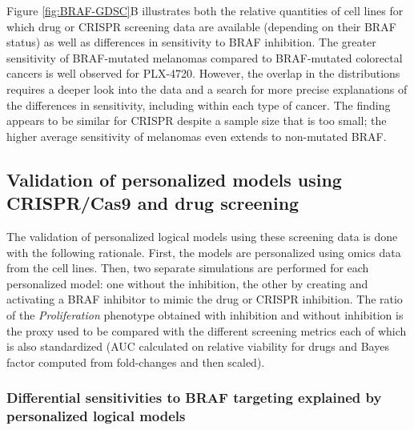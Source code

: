 \documentclass[a4paper,12pt,twoside,onecolumn,openright,final,oldfontcommands]{memoir}
\begin{document}
Figure \ref{fig:BRAF-GDSC}B illustrates both the relative quantities of
cell lines for which drug or CRISPR screening data are available
(depending on their BRAF status) as well as differences in sensitivity
to BRAF inhibition. The greater sensitivity of BRAF-mutated melanomas
compared to BRAF-mutated colorectal cancers is well observed for
PLX-4720. However, the overlap in the distributions requires a deeper
look into the data and a search for more precise explanations of the
differences in sensitivity, including within each type of cancer. The
finding appears to be similar for CRISPR despite a sample size that is
too small; the higher average sensitivity of melanomas even extends to
non-mutated BRAF.

\subsection{Validation of personalized models using CRISPR/Cas9 and drug
screening}\label{validation-of-personalized-models-using-crisprcas9-and-drug-screening}

The validation of personalized logical models using these screening data
is done with the following rationale. First, the models are personalized
using omics data from the cell lines. Then, two separate simulations are
performed for each personalized model: one without the inhibition, the
other by creating and activating a BRAF inhibitor to mimic the drug or
CRISPR inhibition. The ratio of the \emph{Proliferation} phenotype
obtained with inhibition and without inhibition is the proxy used to be
compared with the different screening metrics each of which is also
standardized (AUC calculated on relative viability for drugs and Bayes
factor computed from fold-changes and then scaled).

\subsubsection{Differential sensitivities to BRAF targeting explained by
personalized logical models}\label{diff-BRAF}
\end{document}
